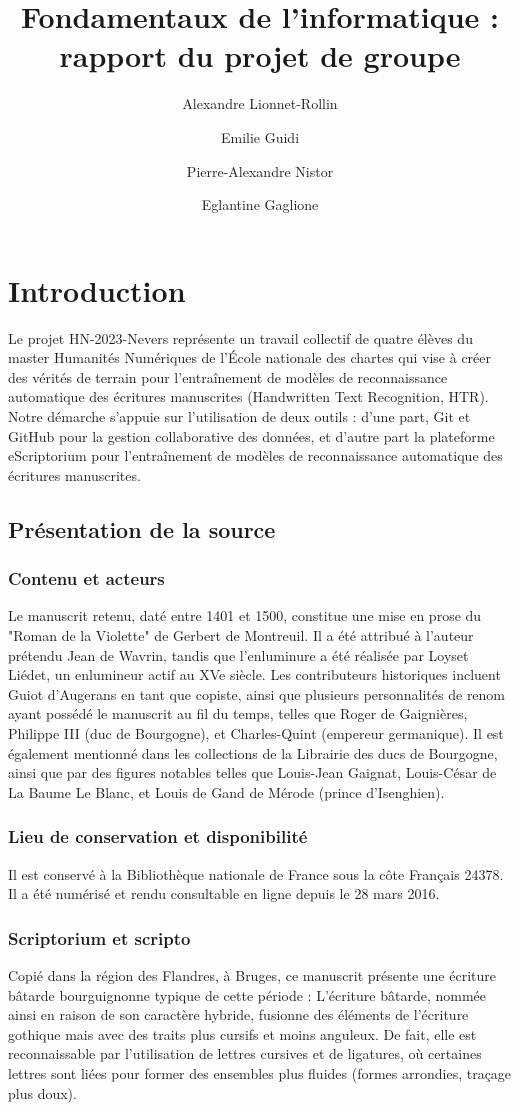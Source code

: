 \documentclass[12pt,a4paper,oneside,titlepage]{article} %
\author{Alexandre Lionnet-Rollin\and Emilie Guidi\and Pierre-Alexandre Nistor\and Eglantine Gaglione}
\title{Fondamentaux de l'informatique : rapport du projet de groupe}
\begin{document}
	
	\maketitle
	


\section{Introduction}
Le projet HN-2023-Nevers représente un travail collectif de quatre élèves du master Humanités Numériques de l'École nationale des chartes qui vise à créer des vérités de terrain pour l'entraînement de modèles de reconnaissance automatique des écritures manuscrites (Handwritten Text Recognition, HTR). Notre démarche s'appuie sur l'utilisation de deux outils : d'une part, Git et GitHub pour la gestion collaborative des données, et d'autre part la plateforme eScriptorium pour l'entraînement de modèles de reconnaissance automatique des écritures manuscrites.
\subsection{Présentation de la source }
\subsubsection{ Contenu et acteurs}
Le manuscrit retenu, daté entre 1401 et 1500, constitue une mise en prose du "Roman de la Violette" de Gerbert de Montreuil. Il a été attribué à l'auteur prétendu Jean de Wavrin, tandis que l'enluminure a été réalisée par Loyset Liédet, un enlumineur actif au XVe siècle. Les contributeurs historiques incluent Guiot d'Augerans en tant que copiste, ainsi que plusieurs personnalités de renom ayant possédé le manuscrit au fil du temps, telles que Roger de Gaignières, Philippe III (duc de Bourgogne), et Charles-Quint (empereur germanique). Il est également mentionné dans les collections de la Librairie des ducs de Bourgogne, ainsi que par des figures notables telles que Louis-Jean Gaignat, Louis-César de La Baume Le Blanc, et Louis de Gand de Mérode (prince d'Isenghien).
\subsubsection{ Lieu de conservation et disponibilité}
Il est conservé à la Bibliothèque nationale de France sous la côte Français 24378.  Il a été numérisé et rendu consultable en ligne depuis le 28 mars 2016. 
\subsubsection{ Scriptorium et scripto}
Copié dans la région des Flandres, à Bruges, ce manuscrit présente une écriture bâtarde bourguignonne typique de cette période : L'écriture bâtarde, nommée ainsi en raison de son caractère hybride, fusionne des éléments de l'écriture gothique mais avec des traits plus cursifs et moins anguleux. De fait, elle est reconnaissable par l'utilisation de lettres cursives et de ligatures, où certaines lettres sont liées pour former des ensembles plus fluides (formes arrondies, traçage plus doux). 
\end{document}
